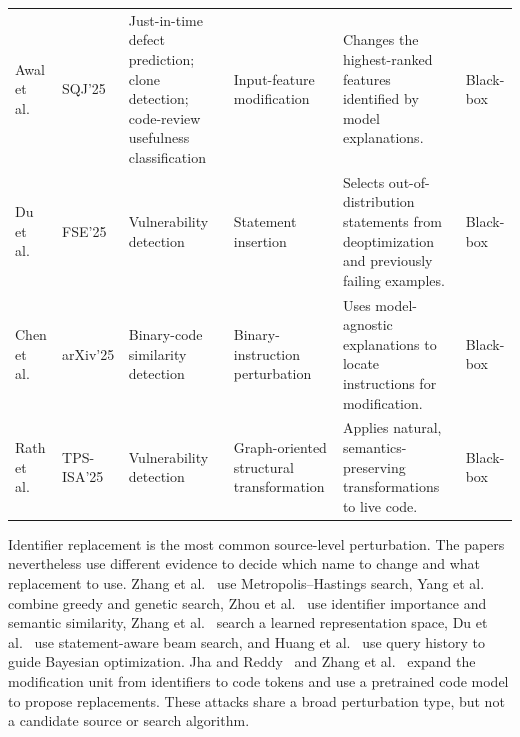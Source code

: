 \documentclass[acmsmall,screen,review]{acmart}
\begin{document}
{\begin{longtable}{@{}L{2.1cm}L{1.5cm}L{2.30cm}L{2.50cm}L{3.50cm}L{1.35cm}@{}}
Awal et al.~\cite{explainability2025} &
SQJ'25 &
Just-in-time defect prediction; clone detection; code-review usefulness classification &
Input-feature modification &
Changes the highest-ranked features identified by model explanations. &
Black-box \\

Du et al.~\cite{sloda2025} &
FSE'25 &
Vulnerability detection &
Statement insertion &
Selects out-of-distribution statements from deoptimization and previously failing examples. &
Black-box \\

Chen et al.~\cite{explainerbcsd2025} &
arXiv'25 &
Binary-code similarity detection &
Binary-instruction perturbation &
Uses model-agnostic explanations to locate instructions for modification. &
Black-box \\

Rath et al.~\cite{natgvd2025} &
TPS-ISA'25 &
Vulnerability detection &
Graph-oriented structural transformation &
Applies natural, semantics-preserving transformations to live code. &
Black-box \\

\end{longtable}
}

Identifier replacement is the most common source-level perturbation. The papers nevertheless use different evidence to decide which name to change and what replacement to use. Zhang et al.~\cite{zhang2020generating} use Metropolis--Hastings search, Yang et al.~\cite{yang2022natural} combine greedy and genetic search, Zhou et al.~\cite{zhou2022accent} use identifier importance and semantic similarity, Zhang et al.~\cite{zhang2023rnns} search a learned representation space, Du et al.~\cite{gu2023beamattack} use statement-aware beam search, and Huang et al.~\cite{huang2025iterative} use query history to guide Bayesian optimization. Jha and Reddy~\cite{jha2023codeattack} and Zhang et al.~\cite{codebertattack2024} expand the modification unit from identifiers to code tokens and use a pretrained code model to propose replacements. These attacks share a broad perturbation type, but not a candidate source or search algorithm.
\end{document}
